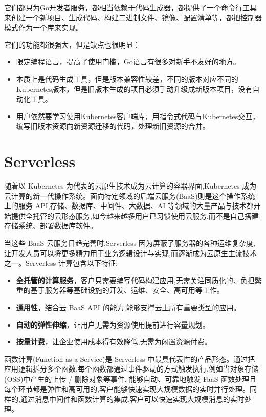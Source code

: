 \documentclass[macfonts,master]{njuthesis}
\begin{document}
它们都只为Go开发者服务，都相当依赖于代码生成器，都提供了一个命令行工具来创建一个新项目、生成代码、构建二进制文件、镜像、配置清单等，都把控制器模式作为一个库来实现。

它们的功能都很强大，但是缺点也很明显：
\begin{itemize}
	\item 限定编程语言，提高了使用门槛，Go语言有很多对新手不友好的地方。
	\item 本质上是代码生成工具，但是版本兼容性较差，不同的版本对应不同的Kubernetes版本，但是旧版本生成的项目必须手动升级成新版本项目，没有自动化工具。
	\item 用户依然要学习使用Kubernetes客户端库，用指令式代码与Kubernetes交互，编写旧版本资源向新资源迁移的代码，处理新旧资源的合并。
\end{itemize}

\section{Serverless}
随着以 Kubernetes 为代表的云原生技术成为云计算的容器界面,Kubernetes 成为云计算的新一代操作系统。面向特定领域的后端云服务(BaaS)则是这个操作系统上的服务 API,存储、数据库、中间件、大数据、AI 等领域的大量产品与技术都开始提供全托管的云形态服务,如今越来越多用户已习惯使用云服务,而不是自己搭建存储系统、部署数据库软件。

当这些 BaaS 云服务日趋完善时,Serverless 因为屏蔽了服务器的各种运维复杂度,让开发人员可以将更多精力用于业务逻辑设计与实现,而逐渐成为云原生主流技术之一。Serverless 计算包含以下特征:

\begin{itemize}
	\item \textbf{全托管的计算服务}，客户只需要编写代码构建应用,无需关注同质化的、负担繁重的基于服务器等基础设施的开发、运维、安全、高可用等工作。
	\item \textbf{通用性}，结合云 BaaS API 的能力,能够支撑云上所有重要类型的应用。
	\item \textbf{自动的弹性伸缩}，让用户无需为资源使用提前进行容量规划。
	\item \textbf{按量计费}，让企业使用成本得有效降低,无需为闲置资源付费。
\end{itemize}

函数计算(Function as a Service)是 Serverless 中最具代表性的产品形态。通过把应用逻辑拆分多个函数,每个函数都通过事件驱动的方式触发执行,例如当对象存储(OSS)中产生的上传 / 删除对象等事件, 能够自动、可靠地触发 FaaS 函数处理且每个环节都是弹性和高可用的,客户能够快速实现大规模数据的实时并行处理。同样的,通过消息中间件和函数计算的集成,客户可以快速实现大规模消息的实时处理。
\end{document}
